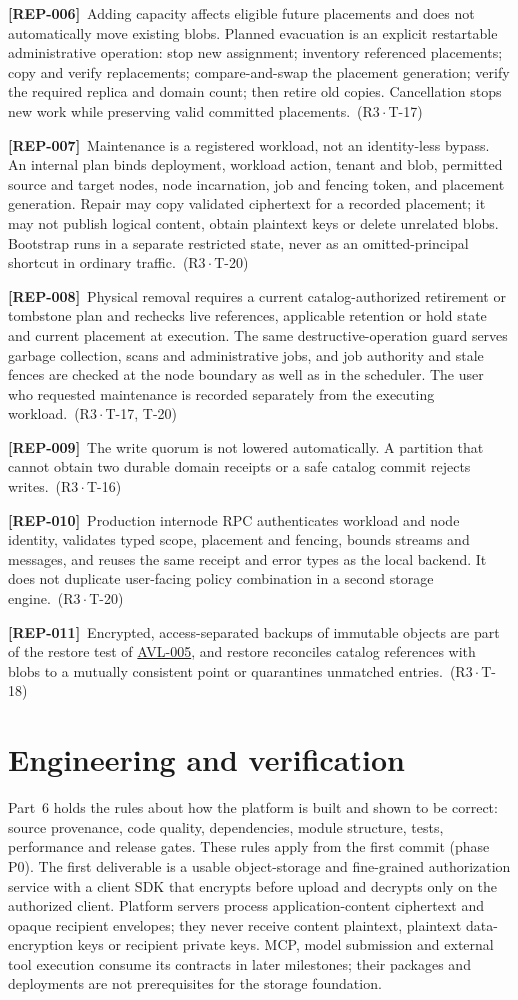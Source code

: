 \documentclass[11pt,a4paper]{article}
\newcommand{\rr}[1]{\hyperlink{req:#1}{#1}}
\newcommand{\reqtag}[2]{{\footnotesize\color{accent}(#1\,$\cdot$\,#2)}}
\newcommand{\req}[4]{\par\noindent\hypertarget{req:#1}{\textbf{[#1]}}\ #4\ \reqtag{#2}{#3}\par}
\begin{document}
\req{REP-006}{R3}{T-17}{Adding capacity affects eligible future placements and does not automatically move existing blobs. Planned evacuation is an explicit restartable administrative operation: stop new assignment; inventory referenced placements; copy and verify replacements; compare-and-swap the placement generation; verify the required replica and domain count; then retire old copies. Cancellation stops new work while preserving valid committed placements.}
\req{REP-007}{R3}{T-20}{Maintenance is a registered workload, not an identity-less bypass. An internal plan binds deployment, workload action, tenant and blob, permitted source and target nodes, node incarnation, job and fencing token, and placement generation. Repair may copy validated ciphertext for a recorded placement; it may not publish logical content, obtain plaintext keys or delete unrelated blobs. Bootstrap runs in a separate restricted state, never as an omitted-principal shortcut in ordinary traffic.}
\req{REP-008}{R3}{T-17, T-20}{Physical removal requires a current catalog-authorized retirement or tombstone plan and rechecks live references, applicable retention or hold state and current placement at execution. The same destructive-operation guard serves garbage collection, scans and administrative jobs, and job authority and stale fences are checked at the node boundary as well as in the scheduler. The user who requested maintenance is recorded separately from the executing workload.}
\req{REP-009}{R3}{T-16}{The write quorum is not lowered automatically. A partition that cannot obtain two durable domain receipts or a safe catalog commit rejects writes.}
\req{REP-010}{R3}{T-20}{Production internode RPC authenticates workload and node identity, validates typed scope, placement and fencing, bounds streams and messages, and reuses the same receipt and error types as the local backend. It does not duplicate user-facing policy combination in a second storage engine.}
\req{REP-011}{R3}{T-18}{Encrypted, access-separated backups of immutable objects are part of the restore test of \rr{AVL-005}, and restore reconciles catalog references with blobs to a mutually consistent point or quarantines unmatched entries.}


\section{Engineering and verification}\label{sec:engineering}
Part~6 holds the rules about how the platform is built and shown to be correct: source provenance, code quality, dependencies, module structure, tests, performance and release gates. These rules apply from the first commit (phase P0). The first deliverable is a usable object-storage and fine-grained authorization service with a client SDK that encrypts before upload and decrypts only on the authorized client. Platform servers process application-content ciphertext and opaque recipient envelopes; they never receive content plaintext, plaintext data-encryption keys or recipient private keys. MCP, model submission and external tool execution consume its contracts in later milestones; their packages and deployments are not prerequisites for the storage foundation.
\end{document}
